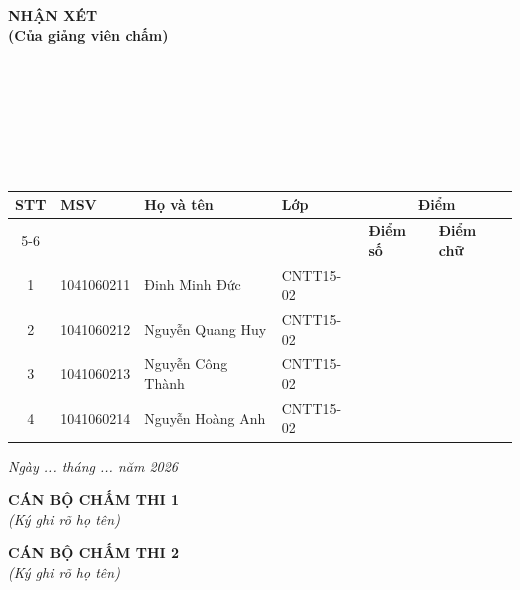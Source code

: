 \newpage
\thispagestyle{empty} %

\begin{center}
    \textbf{\large NHẬN XÉT} \\
    \textbf{(Của giảng viên chấm)}
\end{center}
\vspace{0.5cm}

\noindent\makebox[\linewidth]{\dotfill} \\
\noindent\makebox[\linewidth]{\dotfill} \\
\noindent\makebox[\linewidth]{\dotfill} \\
\noindent\makebox[\linewidth]{\dotfill} \\
\noindent\makebox[\linewidth]{\dotfill} \\
\noindent\makebox[\linewidth]{\dotfill} \\
\vspace{0.5cm}

\begin{table}[h]
    \centering
    \renewcommand{\arraystretch}{1.5}
    \begin{tabular}{|c|p{2.5cm}|p{4cm}|p{2cm}|p{2cm}|p{2cm}|}
        \hline
        \multirow{2}{*}{\textbf{STT}} & \multirow{2}{*}{\centering\textbf{MSV}} & \multirow{2}{*}{\centering\textbf{Họ và tên}} & \multirow{2}{*}{\centering\textbf{Lớp}} & \multicolumn{2}{c|}{\textbf{Điểm}} \\ \cline{5-6} 
         & & & & \centering\textbf{Điểm số} & \centering\textbf{Điểm chữ} \tabularnewline
        \hline
        1 & 1041060211 & Đinh Minh Đức & CNTT15-02 & & \\ \hline
        2 & 1041060212 & Nguyễn Quang Huy & CNTT15-02 & & \\ \hline
        3 & 1041060213 & Nguyễn Công Thành & CNTT15-02 & & \\ \hline
        4 & 1041060214 & Nguyễn Hoàng Anh & CNTT15-02 & & \\ \hline
    \end{tabular}
\end{table}

\vspace{1.5cm}

\begin{flushright}
    \textit{Ngày ... tháng ... năm 2026}
\end{flushright}

\noindent
\begin{minipage}{0.45\textwidth}
    \centering
    \textbf{CÁN BỘ CHẤM THI 1} \\
    \textit{(Ký ghi rõ họ tên)}
\end{minipage}
\hfill
\begin{minipage}{0.45\textwidth}
    \centering
    \textbf{CÁN BỘ CHẤM THI 2} \\
    \textit{(Ký ghi rõ họ tên)}
\end{minipage}

\newpage
\thispagestyle{empty}
\mbox{} %
\newpage